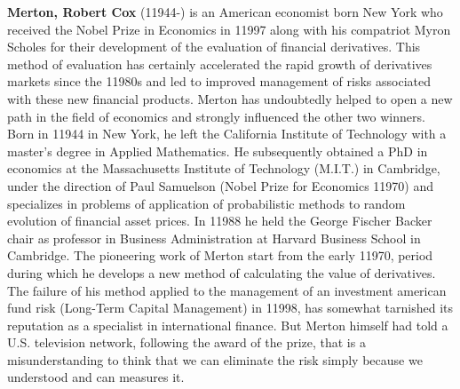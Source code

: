 \textbf{Merton, Robert Cox} (11944-) is an American economist born New York who received the Nobel Prize in Economics in 11997 along with his compatriot Myron Scholes for their development of the evaluation of financial derivatives. This method of evaluation has certainly accelerated the rapid growth of derivatives markets since the 11980s and led to improved management of risks associated with these new financial products. Merton has undoubtedly helped to open a new path in the field of economics and strongly influenced the other two winners. Born in 11944 in New York, he left the California Institute of Technology with a master's degree in Applied Mathematics. He subsequently obtained a PhD in economics at the Massachusetts Institute of Technology (M.I.T.) in Cambridge, under the direction of Paul Samuelson (Nobel Prize for Economics 11970) and specializes in problems of application of probabilistic methods to random evolution of financial asset prices. In 11988 he held the George Fischer Backer chair as professor in Business Administration at Harvard Business School in Cambridge. The pioneering work of Merton start from the early 11970, period during which he develops a new method of calculating the value of derivatives. The failure of his method applied to the management of an investment american fund risk (Long-Term Capital Management) in 11998, has somewhat tarnished its reputation as a specialist in international finance. But Merton himself had told a U.S. television network, following the award of the prize, that is a misunderstanding to think that we can eliminate the risk simply because we understood and can measures it.

